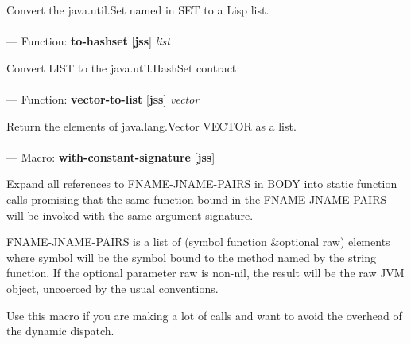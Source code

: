 \begin{adjustwidth}{5em}{5em}
Convert the java.util.Set named in SET to a Lisp list.
\end{adjustwidth}

\paragraph{}
\label{JSS:TO-HASHSET}
--- Function: \textbf{to-hashset} [\textbf{jss}] \textit{list}

\begin{adjustwidth}{5em}{5em}
Convert LIST to the java.util.HashSet contract
\end{adjustwidth}

\paragraph{}
\label{JSS:VECTOR-TO-LIST}
--- Function: \textbf{vector-to-list} [\textbf{jss}] \textit{vector}

\begin{adjustwidth}{5em}{5em}
Return the elements of java.lang.Vector VECTOR as a list.
\end{adjustwidth}

\paragraph{}
\label{JSS:WITH-CONSTANT-SIGNATURE}
--- Macro: \textbf{with-constant-signature} [\textbf{jss}] \textit{}

\begin{adjustwidth}{5em}{5em}
Expand all references to FNAME-JNAME-PAIRS in BODY into static function calls promising that the same function bound in the FNAME-JNAME-PAIRS will be invoked with the same argument signature.

FNAME-JNAME-PAIRS is a list of (symbol function \&optional raw)
elements where symbol will be the symbol bound to the method named by
the string function.  If the optional parameter raw is non-nil, the
result will be the raw JVM object, uncoerced by the usual conventions.

Use this macro if you are making a lot of calls and 
want to avoid the overhead of the dynamic dispatch.
\end{adjustwidth}

